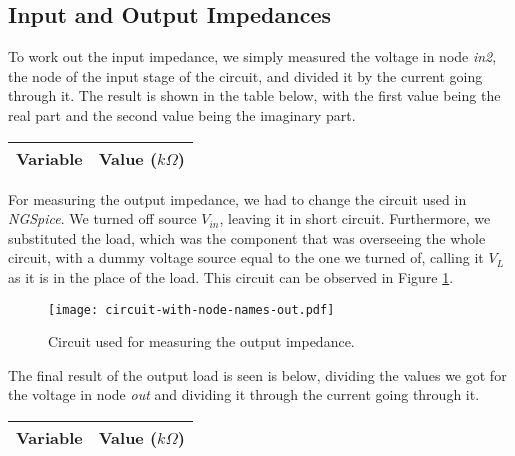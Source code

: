 \subsection{Input and Output Impedances}

To work out the input impedance, we simply measured the voltage in node \textit{in2}, the node of the input stage of the circuit, and divided it by the current going through it. The result is shown in the table below, with the first value being the real part and the second value being the imaginary part.

\vspace{0.4cm}

\begin{center}
\begin{tabular}{|l|r|}
  \hline    
  {\bf Variable} & {\bf Value ($k\Omega$)} \\ \hline
  
\end{tabular}
\end{center}

\vspace{0.4cm}

For measuring the output impedance, we had to change the circuit used in \textit{NGSpice}. We turned off source $V_{in}$, leaving it in short circuit. Furthermore, we substituted the load, which was the component that was overseeing the whole circuit, with a dummy voltage source equal to the one we turned of, calling it $V_L$ as it is in the place of the load. This circuit can be observed in Figure \ref{fig:circuit-2-spice}.

\vspace{0.4cm}


\begin{figure}[h] \centering
\texttt{[image: circuit-with-node-names-out.pdf]}
\caption{Circuit used for measuring the output impedance.}
\label{fig:circuit-2-spice}
\end{figure}

\vspace{0.4cm}

The final result of the output load is seen is below, dividing the values we got for the voltage in node \textit{out} and dividing it through the current going through it.

\vspace{0.4cm}

\begin{center}
\begin{tabular}{|l|r|}
  \hline    
  {\bf Variable} & {\bf Value ($k\Omega$)} \\ \hline
  
\end{tabular}
\end{center}

